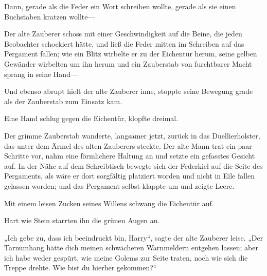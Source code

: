 Dann, gerade als die Feder ein Wort schreiben wollte, gerade als sie einen Buchstaben kratzen wollte—

Der alte Zauberer schoss mit einer Geschwindigkeit auf die Beine, die jeden Beobachter schockiert hätte, und ließ die Feder mitten im Schreiben auf das Pergament fallen; wie ein Blitz wirbelte er zu der Eichentür herum, seine gelben Gewänder wirbelten um ihn herum und ein Zauberstab von furchtbarer Macht sprang in seine Hand—

Und ebenso abrupt hielt der alte Zauberer inne, stoppte seine Bewegung grade als der Zauberstab zum Einsatz kam.

Eine Hand schlug gegen die Eichentür, klopfte dreimal.

Der grimme Zauberstab wanderte, langsamer jetzt, zurück in das Duellierholster, das unter dem Ärmel des alten Zauberers steckte. Der alte Mann trat ein paar Schritte vor, nahm eine förmlichere Haltung an und setzte ein gefasstes Gesicht auf. In der Nähe auf dem Schreibtisch bewegte sich der Federkiel auf die Seite des Pergaments, als wäre er dort sorgfältig platziert worden und nicht in Eile fallen gelassen worden; und das Pergament selbst klappte um und zeigte Leere.

Mit einem leisen Zucken seines Willens schwang die Eichentür auf.

Hart wie Stein starrten ihn die grünen Augen an.

„Ich gebe zu, dass ich beeindruckt bin, Harry“, sagte der alte Zauberer leise. „Der Tarnumhang hätte dich meinen schwächeren Warnmeldern entgehen lassen; aber ich habe weder gespürt, wie meine Golems zur Seite traten, noch wie sich die Treppe drehte. Wie bist du hierher gekommen?“

